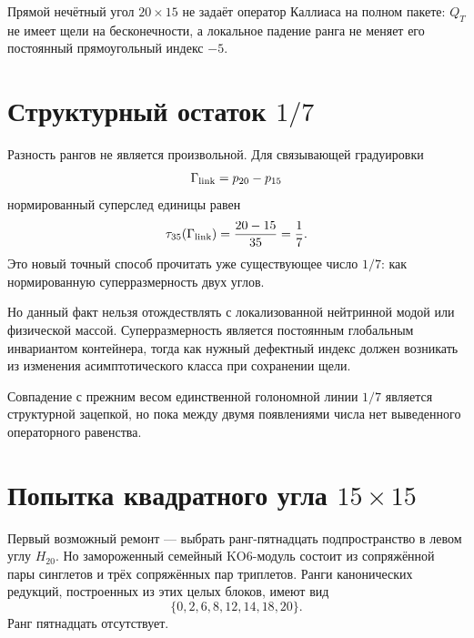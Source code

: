 \begin{nogocriterion}
Прямой нечётный угол $20\times15$ не задаёт оператор Каллиаса на полном
пакете: $Q_T$ не имеет щели на бесконечности, а локальное падение ранга не
меняет его постоянный прямоугольный индекс $-5$.
\end{nogocriterion}

\section{Структурный остаток \texorpdfstring{$1/7$}{1/7}}

Разность рангов не является произвольной. Для связывающей градуировки
\begin{equation}
 \Gamma_{\rm link}=p_{20}-p_{15}
\end{equation}
нормированный суперслед единицы равен
\begin{equation}
 \tau_{35}(\Gamma_{\rm link})
 =\frac{20-15}{35}=\frac17.
 \label{eq:v5-odd-core-one-seventh-superdimension}
\end{equation}
Это новый точный способ прочитать уже существующее число $1/7$: как
нормированную суперразмерность двух углов.

Но данный факт нельзя отождествлять с локализованной нейтринной модой или
физической массой. Суперразмерность является постоянным глобальным
инвариантом контейнера, тогда как нужный дефектный индекс должен возникать
из изменения асимптотического класса при сохранении щели.

\begin{remark}
Совпадение с прежним весом единственной голономной линии $1/7$ является
структурной зацепкой, но пока между двумя появлениями числа нет выведенного
операторного равенства.
\end{remark}

\section{Попытка квадратного угла
\texorpdfstring{$15\times15$}{15 x 15}}

Первый возможный ремонт --- выбрать ранг-пятнадцать подпространство в
левом углу $H_{20}$. Но замороженный семейный KO6-модуль состоит из
сопряжённой пары синглетов и трёх сопряжённых пар триплетов. Ранги
канонических редукций, построенных из этих целых блоков, имеют вид
\begin{equation}
 \{0,2,6,8,12,14,18,20\}.
 \label{eq:v5-odd-core-compatible-ranks}
\end{equation}
Ранг пятнадцать отсутствует.

